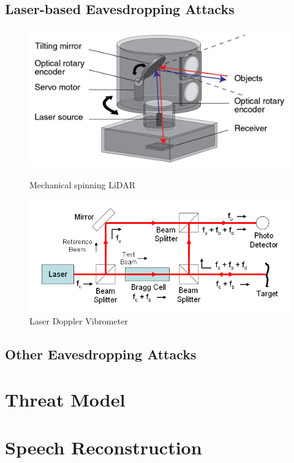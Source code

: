 \documentclass[sigconf, nonacm]{acmart}
\begin{document}
\subsection{Laser-based Eavesdropping Attacks}

\begin{figure}[h]
  \centering
  \includegraphics[width=\linewidth]{embed/Lidar_scanner.jpg}
  \caption{Mechanical spinning LiDAR \cite{RenishawLidar}}

  \vspace{0.5cm}

  \includegraphics[width=\linewidth]{embed/Laser_Doppler_Vibrometer.png}
  \caption{Laser Doppler Vibrometer \cite{WikipediaLDV}}
\end{figure}

\subsection{Other Eavesdropping Attacks}
\section{Threat Model}
\section{Speech Reconstruction}
\end{document}
